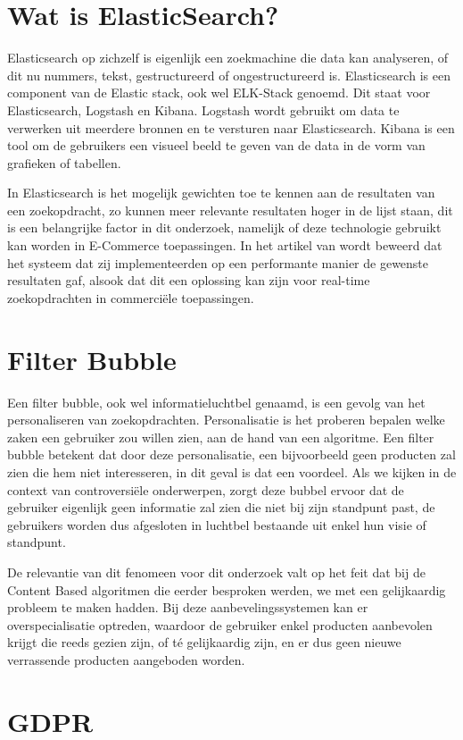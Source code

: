 \section{Wat is ElasticSearch?}
\label{sec:wat is ElasticSearch?}

Elasticsearch op zichzelf is eigenlijk een zoekmachine die data kan analyseren, of dit nu nummers, tekst, gestructureerd of ongestructureerd is. Elasticsearch is een component van de Elastic stack, ook wel ELK-Stack genoemd. Dit staat voor Elasticsearch, Logstash en Kibana. Logstash wordt gebruikt om data te verwerken uit meerdere bronnen en te versturen naar Elasticsearch. Kibana is een tool om de gebruikers een visueel beeld te geven van de data in de vorm van grafieken of tabellen.

In Elasticsearch is het mogelijk gewichten toe te kennen aan de resultaten van een zoekopdracht, zo kunnen meer relevante resultaten hoger in de lijst staan, dit is een belangrijke factor in dit onderzoek, namelijk of deze technologie gebruikt kan worden in E-Commerce toepassingen. In het artikel van \cite{Vavliakis2019} wordt beweerd dat het systeem dat zij implementeerden op een performante manier de gewenste resultaten gaf, alsook dat dit een oplossing kan zijn voor real-time zoekopdrachten in commerciële toepassingen.


\section{Filter Bubble}
\label{sec:Filter Bubble}

Een filter bubble, ook wel informatieluchtbel genaamd, is een gevolg van het personaliseren van zoekopdrachten. Personalisatie is het proberen bepalen welke zaken een gebruiker zou willen zien, aan de hand van een algoritme. Een filter bubble betekent dat door deze personalisatie, een bijvoorbeeld geen producten zal zien die hem niet interesseren, in dit geval is dat een voordeel. Als we kijken in de context van controversiële onderwerpen, zorgt deze bubbel ervoor dat de gebruiker eigenlijk geen informatie zal zien die niet bij zijn standpunt past, de gebruikers worden dus afgesloten in luchtbel bestaande uit enkel hun visie of standpunt.  \autocite{Pariser2011}

De relevantie van dit fenomeen voor dit onderzoek valt op het feit dat bij de Content Based algoritmen die eerder besproken werden, we met een gelijkaardig probleem te maken hadden. Bij deze aanbevelingssystemen kan er overspecialisatie optreden, waardoor de gebruiker enkel producten aanbevolen krijgt die reeds gezien zijn, of té gelijkaardig zijn, en er dus geen nieuwe verrassende producten aangeboden worden.

\section{GDPR}
\label{sec:GDPR}


